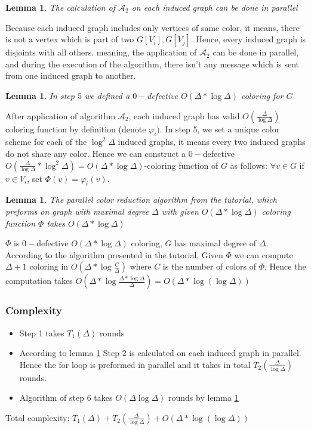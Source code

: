 \documentclass[11pt]{article}
\newtheorem{lemma}[theorem]{Lemma}
\begin{document}
\begin{lemma}
\label{A_2_parallel}
The calculation of $\mathcal{A}_2$ on each induced graph can be done in parallel
\end{lemma}
Because each induced graph includes only vertices of same color, it means, there is not a vertex which is part of two $G[V_i], G[V_j]$. Hence, every induced graph is disjoints with all others. meaning, the application of $\mathcal{A}_2$ can be done in parallel, and during the execution of the algorithm, there isn't any message which is sent from one induced graph to another.

\begin{lemma}
In step $5$ we defined a $0-$defective $O(\Delta*\log{\Delta})$ coloring for $G$
\end{lemma}
After application of algorithm $\mathcal{A}_2$, each induced graph has valid $O(\frac{\Delta}{\log{\Delta}})$ coloring function by definition (denote $\varphi_i)$. In step 5, we set a unique color scheme for each of the $\log^2{\Delta}$ induced graphs, it means every two induced graphs do not share any color. Hence we can construct a  $0-$defective $O(\frac{\Delta}{\log{\Delta}} * \log^2{\Delta})
=O(\Delta * \log{\Delta})$-coloring function of $G$ as follows: $\forall v \in G$ if $v \in V_i$, set $\Phi(v) = \varphi_i(v)$. 
\begin{lemma}
\label{parallel_reduction_tutorial}
The parallel color reduction algorithm from the tutorial, which preforms on graph with maximal degree $\Delta$ with given $O(\Delta * \log{\Delta})$ coloring function $\Phi$ takes $O(\Delta * \log{\Delta})$
\end{lemma}
$\Phi$ is $0-$defective $O(\Delta*\log{\Delta})$ coloring, $G$ has maximal degree of $\Delta$. According to the algorithm presented in the tutorial, Given $\Phi$ we can compute $\Delta+1$ coloring in 
$O(\Delta * \log{\frac{C}{\Delta}})$ where $C$ is the number of colors of $\Phi$, Hence the computation takes $O(\Delta * \log{\frac{\Delta*\log{\Delta}}{\Delta}})=O(\Delta * \log({\log{\Delta}}))
$


\subsubsection*{Complexity}
\begin{itemize}
    \item Step 1 takes $T_1(\Delta)$ rounds
    \item According to lemma \ref{A_2_parallel} Step 2 is calculated on each induced graph in parallel. Hence the for loop is preformed in parallel and it takes in total $T_2(\frac{\Delta}{\log{\Delta}})$ rounds. 
    \item Algorithm of step 6 takes $O(\Delta\log{\Delta})$ rounds by lemma \ref{parallel_reduction_tutorial}
\end{itemize}

Total complexity: $T_1(\Delta) + T_2(\frac{\Delta}{\log{\Delta}}) + O(\Delta * \log({\log{\Delta}}))$ 
\end{document}

